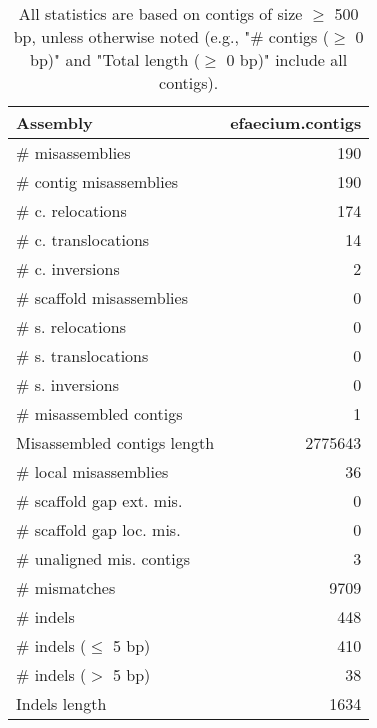\documentclass[12pt,a4paper]{article}
\begin{document}
\begin{table}[ht]
\begin{center}
\caption{All statistics are based on contigs of size $\geq$ 500 bp, unless otherwise noted (e.g., "\# contigs ($\geq$ 0 bp)" and "Total length ($\geq$ 0 bp)" include all contigs).}
\begin{tabular}{|l*{1}{|r}|}
\hline
Assembly & efaecium.contigs \\ \hline
\# misassemblies & 190 \\ \hline
\hspace{2mm}\# contig misassemblies & 190 \\ \hline
\hspace{5mm}\# c. relocations & 174 \\ \hline
\hspace{5mm}\# c. translocations & 14 \\ \hline
\hspace{5mm}\# c. inversions & 2 \\ \hline
\hspace{2mm}\# scaffold misassemblies & 0 \\ \hline
\hspace{5mm}\# s. relocations & 0 \\ \hline
\hspace{5mm}\# s. translocations & 0 \\ \hline
\hspace{5mm}\# s. inversions & 0 \\ \hline
\# misassembled contigs & 1 \\ \hline
Misassembled contigs length & 2775643 \\ \hline
\# local misassemblies & 36 \\ \hline
\# scaffold gap ext. mis. & 0 \\ \hline
\# scaffold gap loc. mis. & 0 \\ \hline
\# unaligned mis. contigs & 3 \\ \hline
\# mismatches & 9709 \\ \hline
\# indels & 448 \\ \hline
\hspace{5mm}\# indels ($\leq$ 5 bp) & 410 \\ \hline
\hspace{5mm}\# indels ($>$ 5 bp) & 38 \\ \hline
Indels length & 1634 \\ \hline
\end{tabular}
\end{center}
\end{table}
\end{document}
